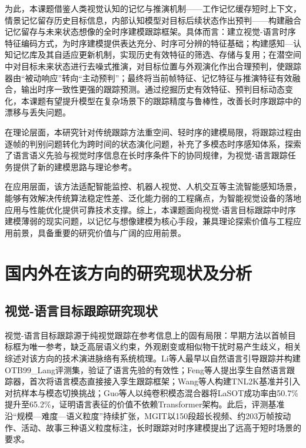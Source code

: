 为此，本课题借鉴人类视觉认知的记忆与推演机制——工作记忆缓存短时上下文，情景记忆留存历史目标信息，内部认知模型对目标后续状态作出预判——构建融合记忆留存与未来状态想像的全时序建模跟踪框架。具体而言：建立视觉-语言时序特征编码方式，为时序建模提供表达充分、时序可分辨的特征基础；构建感知—认知记忆库及其自适应更新机制，实现历史有效特征的筛选、存储与复用；在潜空间中对目标未来状态进行去噪式推演，对目标位置与外观演化作出合理预判，使跟踪器由“被动响应”转向“主动预判”；最终将当前帧特征、记忆特征与推演特征有效融合，输出时序一致性更强的跟踪预测。通过挖掘历史有效特征、预判目标动态变化，本课题有望提升模型在复杂场景下的跟踪精度与鲁棒性，改善长时序跟踪中的漂移与丢失问题。

在理论层面，本研究针对传统跟踪方法重空间、轻时序的建模局限，将跟踪过程由逐帧的判别问题转化为跨时间的状态演化问题，补充了多模态时序感知体系，探索了语言语义先验与视觉时序信息在长时序条件下的协同规律，为视觉-语言跟踪任务提供了新的建模思路与理论参考。

在应用层面，该方法适配智能监控、机器人视觉、人机交互等主流智能感知场景，能够有效解决传统算法稳定性差、泛化能力弱的工程痛点，为智能视觉设备的落地应用与性能优化提供可靠技术支撑。综上，本课题面向视觉-语言目标跟踪中时序建模薄弱的现实问题，以记忆与想像建模为核心手段，兼具理论探索价值与工程应用前景，具备重要的研究价值与广阔的应用前景。

\section{国内外在该方向的研究现状及分析}

\subsection{视觉-语言目标跟踪研究现状}

视觉-语言目标跟踪源于纯视觉跟踪在参考信息上的固有局限：早期方法以首帧目标框为唯一参考，缺乏高层语义约束，外观剧变或相似物干扰时易产生歧义，相关综述对该方向的技术演进脉络有系统梳理\cite{ma2024review}。Li等人\cite{li2017tracking}最早以自然语言引导跟踪并构建OTB99\_Lang评测集，验证了语言先验的有效性；Feng等人\cite{feng2021siamnlt}提出孪生自然语言跟踪器，首次将语言模态直接接入孪生跟踪框架；Wang等人\cite{wang2021tnl2k}构建TNL2K基准并引入对抗样本与模态切换挑战；Guo等人\cite{guo2024divert}以纯卷积模态混合器将LaSOT\cite{fan2021lasot}成功率由50.7\%提升至65.2\%，证明语言表征的价值不依赖Transformer架构。此后，评测基准沿“规模—难度—语义粒度”持续扩张，MGIT\cite{hu2023mgit}以150段超长视频、约203万帧按动作、活动、故事三种语义粒度标注，长时跟踪对时序建模提出了远高于短时场景的要求。

